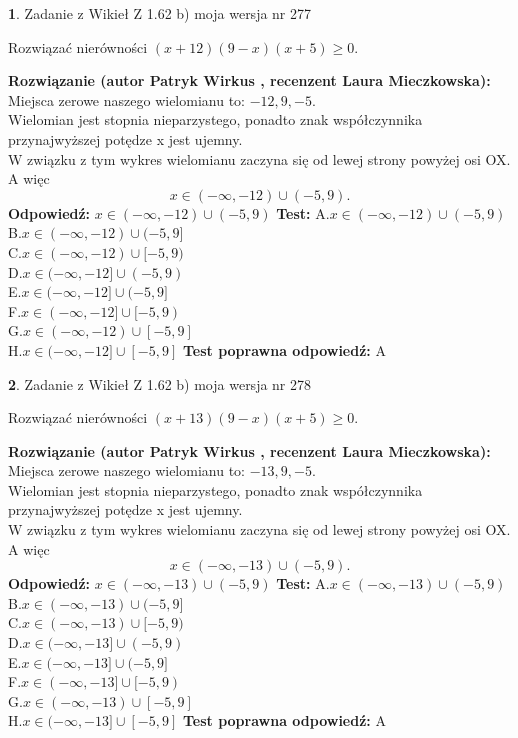 \documentclass[12pt, a4paper]{article}
\theoremstyle{definition} %
\newtheorem{zad}{}
\newcommand{\zadStart}[1]{\begin{zad}#1\newline}
\newcommand{\zadStop}{\end{zad}}
\newcommand{\rozwStart}[2]{\noindent \textbf{Rozwiązanie (autor #1 , recenzent #2): }\newline}
\newcommand{\rozwStop}{\newline}
\newcommand{\odpStart}{\noindent \textbf{Odpowiedź:}\newline}
\newcommand{\odpStop}{\newline}
\newcommand{\testStart}{\noindent \textbf{Test:}\newline}
\newcommand{\testStop}{\newline}
\newcommand{\kluczStart}{\noindent \textbf{Test poprawna odpowiedź:}\newline}
\newcommand{\kluczStop}{\newline}
\begin{document}
\zadStart{Zadanie z Wikieł Z 1.62 b) moja wersja nr 277}

Rozwiązać nierówności $(x+12)(9-x)(x+5)\ge0$.
\zadStop
\rozwStart{Patryk Wirkus}{Laura Mieczkowska}
Miejsca zerowe naszego wielomianu to: $-12, 9, -5$.\\
Wielomian jest stopnia nieparzystego, ponadto znak współczynnika przy\linebreak najwyższej potędze x jest ujemny.\\ W związku z tym wykres wielomianu zaczyna się od lewej strony powyżej osi OX. A więc $$x \in (-\infty,-12) \cup (-5,9).$$
\rozwStop
\odpStart
$x \in (-\infty,-12) \cup (-5,9)$
\odpStop
\testStart
A.$x \in (-\infty,-12) \cup (-5,9)$\\
B.$x \in (-\infty,-12) \cup (-5,9]$\\
C.$x \in (-\infty,-12) \cup [-5,9)$\\
D.$x \in (-\infty,-12] \cup (-5,9)$\\
E.$x \in (-\infty,-12] \cup (-5,9]$\\
F.$x \in (-\infty,-12] \cup [-5,9)$\\
G.$x \in (-\infty,-12) \cup [-5,9]$\\
H.$x \in (-\infty,-12] \cup [-5,9]$
\testStop
\kluczStart
A
\kluczStop



\zadStart{Zadanie z Wikieł Z 1.62 b) moja wersja nr 278}

Rozwiązać nierówności $(x+13)(9-x)(x+5)\ge0$.
\zadStop
\rozwStart{Patryk Wirkus}{Laura Mieczkowska}
Miejsca zerowe naszego wielomianu to: $-13, 9, -5$.\\
Wielomian jest stopnia nieparzystego, ponadto znak współczynnika przy\linebreak najwyższej potędze x jest ujemny.\\ W związku z tym wykres wielomianu zaczyna się od lewej strony powyżej osi OX. A więc $$x \in (-\infty,-13) \cup (-5,9).$$
\rozwStop
\odpStart
$x \in (-\infty,-13) \cup (-5,9)$
\odpStop
\testStart
A.$x \in (-\infty,-13) \cup (-5,9)$\\
B.$x \in (-\infty,-13) \cup (-5,9]$\\
C.$x \in (-\infty,-13) \cup [-5,9)$\\
D.$x \in (-\infty,-13] \cup (-5,9)$\\
E.$x \in (-\infty,-13] \cup (-5,9]$\\
F.$x \in (-\infty,-13] \cup [-5,9)$\\
G.$x \in (-\infty,-13) \cup [-5,9]$\\
H.$x \in (-\infty,-13] \cup [-5,9]$
\testStop
\kluczStart
A
\kluczStop
\end{document}
